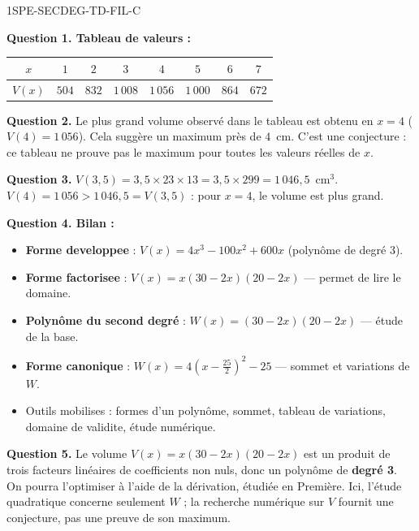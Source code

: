\begin{corrige}{1SPE-SECDEG-TD-FIL-C}

\textbf{Question 1. Tableau de valeurs :}

\begin{center}
\begin{tabular}{|c|c|c|c|c|c|c|c|}
\hline
$x$ & $1$ & $2$ & $3$ & $4$ & $5$ & $6$ & $7$ \\
\hline
$V(x)$ & $504$ & $832$ & $1\,008$ & $1\,056$ & $1\,000$ & $864$ & $672$ \\
\hline
\end{tabular}
\end{center}

\textbf{Question 2.} Le plus grand volume observé dans le tableau est obtenu
en $x=4$ ($V(4)=1\,056$). Cela suggère un maximum près de $4$~cm.
C'est une conjecture : ce tableau ne prouve pas le maximum pour toutes les valeurs réelles de $x$.

\textbf{Question 3.} $V(3{,}5) = 3{,}5 \times 23 \times 13 = 3{,}5 \times 299 = 1\,046{,}5$~cm$^3$.
$V(4) = 1\,056 > 1\,046{,}5 = V(3{,}5)$ : pour $x = 4$, le volume est plus grand.


\textbf{Question 4. Bilan :}
\begin{itemize}
  \item \textbf{Forme developpee} : $V(x) = 4x^3 - 100x^2 + 600x$ (polynôme de degré 3).
  \item \textbf{Forme factorisee} : $V(x) = x(30-2x)(20-2x)$ — permet de lire le domaine.
  \item \textbf{Polynôme du second degré} : $W(x) = (30-2x)(20-2x)$ — étude de la base.
  \item \textbf{Forme canonique} : $W(x)=4\left(x-\frac{25}{2}\right)^2-25$ — sommet et variations de $W$.
  \item Outils mobilises : formes d'un polynôme, sommet, tableau de variations, domaine de validite, étude numérique.
\end{itemize}

\textbf{Question 5.} Le volume $V(x) = x(30-2x)(20-2x)$ est un produit de trois
facteurs linéaires de coefficients non nuls, donc un polynôme de \textbf{degré 3}.
On pourra l'optimiser à l'aide de la dérivation, étudiée en Première.
Ici, l'étude quadratique concerne seulement $W$ ; la recherche numérique sur
$V$ fournit une conjecture, pas une preuve de son maximum.

\end{corrige}
